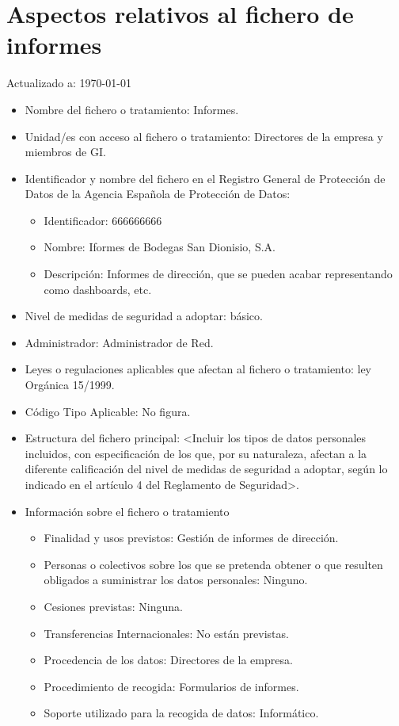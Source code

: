 \documentclass[a4paper,11pt,bibtotoc,noliststotoc]{scrbook}
\newcommand{\laorganizacion}{Bodegas San Dionisio, S.A.}
\begin{document}
\section{Aspectos relativos al fichero de informes}


Actualizado a: \today

\begin{itemize}
\item Nombre del fichero o tratamiento: Informes.

\item Unidad/es con acceso al fichero o tratamiento: Directores de la empresa y miembros de GI.

\item Identificador y nombre del fichero en el Registro General de Protección de Datos de la Agencia Española de Protección de Datos:
	\begin{itemize}
	\item Identificador: 666666666
	\item Nombre: Iformes de \laorganizacion
	\item Descripción: Informes de dirección, que se pueden acabar representando como dashboards, etc.
	\end{itemize}

\item Nivel de medidas de seguridad a adoptar: básico.

\item Administrador: Administrador de Red.

\item Leyes o regulaciones aplicables que afectan al fichero o tratamiento: ley Orgánica 15/1999.

\item Código Tipo Aplicable: No figura.

\item Estructura del fichero principal: <Incluir los tipos de datos personales incluidos, con especificación de los que, por su naturaleza, afectan a la diferente calificación del nivel de medidas de seguridad a adoptar, según lo indicado en el artículo 4 del Reglamento de Seguridad>.

\item Información sobre el fichero o tratamiento
	\begin{itemize}
	\item Finalidad y usos previstos: Gestión de informes de dirección.
	\item Personas o colectivos sobre los que se pretenda obtener o que resulten obligados a suministrar los datos personales: Ninguno.
	\item Cesiones previstas: Ninguna.
	\item Transferencias Internacionales: No están previstas.
	\item Procedencia de los datos: Directores de la empresa.
	\item Procedimiento de recogida: Formularios de informes.
	\item Soporte utilizado para la recogida de datos: Informático.
	\end{itemize}


\end{itemize}
\end{document}
